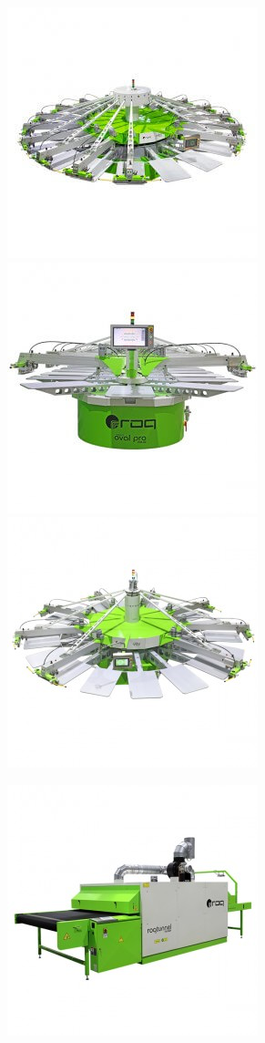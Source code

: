 \begin{frame}
\begin{figure}[ht]
\begin{center}
\includegraphics[scale=0.2]{./image/ROQ/maquinas/NEXTP18-600x6001-275x275.jpg}
\includegraphics[scale=0.2]{./image/ROQ/maquinas/PRO-600x600-275x275.jpg}
\includegraphics[scale=0.2]{./image/ROQ/maquinas/You-600x600-275x275}
\end{center}
\begin{center}
\includegraphics[scale=0.2]{./image/ROQ/maquinas/T3018GP_600x600-275x275.jpg}

\end{center}
\end{figure}
\end{frame}
